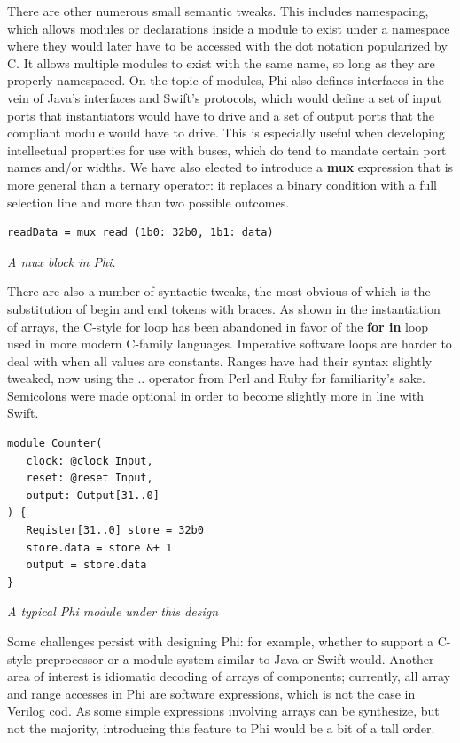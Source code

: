 \documentclass[10pt, two column]{article}
\theoremstyle{definition}
\begin{document}
There are other numerous small semantic tweaks. This includes namespacing, which allows modules or declarations inside a module to exist under a namespace where they would later have to be accessed with the dot notation popularized by C. It allows multiple modules to exist with the same name, so long as they are properly namespaced. On the topic of modules, Phi also defines interfaces in the vein of Java’s 
interfaces and Swift’s protocols, which would define a set of input ports that instantiators would have to drive and a set of output ports that the compliant module would have to drive. This is especially useful when developing intellectual properties for use with buses, which do tend to mandate certain port names and/or widths. We have also elected to introduce a \textbf{mux} expression that is more general than a ternary operator: it replaces a binary condition with a full selection line and more than two possible outcomes.\par

\begin{lstlisting}
readData = mux read (1b0: 32b0, 1b1: data)
\end{lstlisting}
\begin{center}
\textit {A mux block in Phi.}
\end{center}

There are also a number of syntactic tweaks, the most obvious of which is the substitution of begin and end tokens with braces. As shown in the instantiation of arrays, the C-style for loop has been abandoned in favor of the \textbf{for in} loop used in more modern C-family languages. Imperative software loops are harder to deal with when all values are constants. Ranges have had their syntax slightly tweaked, now using the .. operator from Perl and Ruby for familiarity's sake. Semicolons were made optional in order to become slightly more in line with Swift.\par

\begin{lstlisting}
module Counter(
   clock: @clock Input,
   reset: @reset Input,
   output: Output[31..0]
) {
   Register[31..0] store = 32b0
   store.data = store &+ 1
   output = store.data
}
\end{lstlisting}
\begin{center}
\textit{A typical Phi module under this design}
\end{center}

Some challenges persist with designing Phi: for example, whether to support a C-style preprocessor or a module system similar to Java or Swift would. Another area of interest is idiomatic decoding of arrays of components; currently, all array and range accesses in Phi are software expressions, which is not the case in Verilog cod. As some simple expressions involving arrays can be synthesize, but not the majority, introducing this feature to Phi would be a bit of a tall order.
\end{document}
